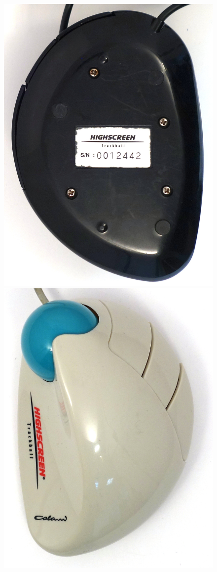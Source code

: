 \documentclass[11pt, a4paper]{article}
\begin{document}
\begin{figure}[h]
    \includegraphics[scale=0.5]{1993_colani_trackball/bottom_b_30.jpg}
    \includegraphics[scale=0.4]{1993_colani_trackball/top_w_30.jpg}

\end{figure}
\end{document}
